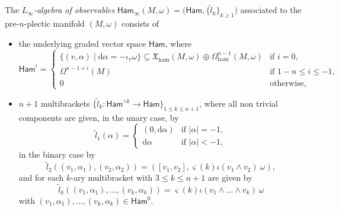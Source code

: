 \documentclass[pdftex]{sigma}
\numberwithin{equation}{section}
\newcommand{\Ham}{\mathsf{Ham}}
\newcommand{\ham}{\text{ham}}
\newcommand{\X}{\mathfrak{X}}
\renewcommand{\subset}{\subseteq}
\renewcommand{\d}{\mathrm{d}}
\begin{document}
\begin{Definition}\label{def:algebra_of_observables}
	The \emph{$L_{\infty}$-algebra of observables} $\Ham_\infty(M,\omega)=\bigl(\Ham,\bigl\{\tilde{l}_k\bigr\}_{k\geq 1}\bigr)$ associated to the pre-$n$-plectic manifold $(M,\omega)$ consists of
	\begin{itemize}\itemsep=0pt
		\item the underlying graded vector space $\Ham$, where
		\[
			\Ham^i=\begin{cases}
				\{(v,\alpha)\mid \d\alpha=-\iota_v\omega\}\subset \X_\ham(M,\omega)\oplus\Omega_{\ham}^{n-1}(M,\omega)
				&  \text{if } i=0,
				\\
				\Omega^{n-1+i}(M)
				&   \text{if } 1-n \leq i\leq -1,
				\\			
				0 & \text{otherwise,}
			\end{cases}
		\]

	\item $n+1$ multibrackets $\bigl\lbrace \tilde{l}_k\colon \Ham^{\wedge k} \to \Ham\bigr\rbrace_{1\leq k\leq n+1}$, where all non trivial components are given, in the unary case, by
		\[
			\tilde{l}_1(\alpha) =
			\begin{cases}
				(0,\d\alpha)	& \text{if~} |\alpha| = -1,	\\
				\d\alpha	& \text{if~} |\alpha| <-1,
			\end{cases}
		\]
		in the binary case by
		\[
			\tilde{l}_2 ((v_1,\alpha_1),(v_2,\alpha_2) ) =
				 ([v_1,v_2], \varsigma(k) \iota(v_1\wedge v_2)~\omega )
				,
		\]
		and for each $k$-ary multibracket with $3\leq k\leq n+1$ are given by
		\[
			\tilde{l}_k ((v_1,\alpha_1),\dots,(v_k,\alpha_k) ) =
				\varsigma(k) \iota(v_1\wedge\dots\wedge v_k)~\omega
		\]
		with  $(v_1,\alpha_1),\dots,(v_k,\alpha_k)\in\Ham^0$.%
	\end{itemize}
\end{Definition}
\end{document}
